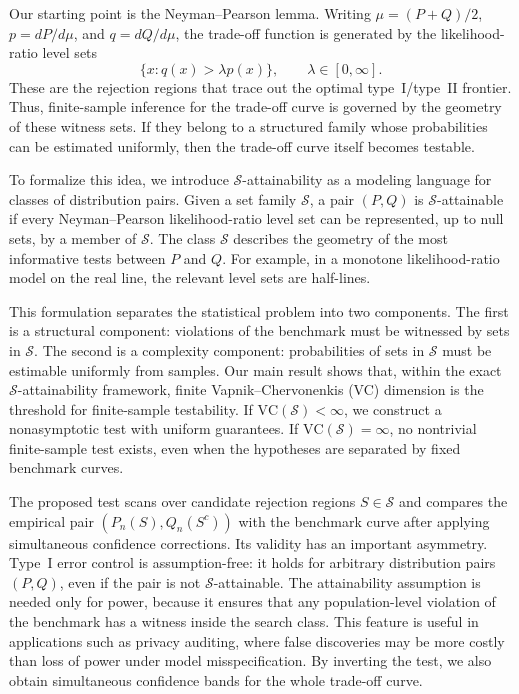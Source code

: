 \documentclass[english]{article}
\theoremstyle{plain}
\theoremstyle{definition}
\begin{document}
Our starting point is the Neyman--Pearson lemma. Writing \(\mu=(P+Q)/2\), \(p=dP/d\mu\), and \(q=dQ/d\mu\), the trade-off function is generated by the likelihood-ratio level sets
\[
\{x:q(x)>\lambda p(x)\}, \qquad \lambda \in [0, \infty].
\]
These are the rejection regions that trace out the optimal type~I/type~II frontier. Thus, finite-sample inference for the trade-off curve is governed by the geometry of these witness sets. If they belong to a structured family whose probabilities can be estimated uniformly, then the trade-off curve itself becomes testable.

To formalize this idea, we introduce \(\mathcal S\)-attainability as a modeling language for classes of distribution pairs. Given a set family \(\mathcal S\), a pair \((P,Q)\) is \(\mathcal S\)-attainable if every Neyman--Pearson likelihood-ratio level set can be represented, up to null sets, by a member of \(\mathcal S\). The class \(\mathcal S\) describes the geometry of the most
informative tests between \(P\) and \(Q\). For example, in a monotone
likelihood-ratio model on the real line, the relevant level sets are
half-lines.

This formulation separates the statistical problem into two components. The
first is a structural component: violations of the benchmark must be witnessed
by sets in \(\mathcal S\). The second is a complexity component: probabilities
of sets in \(\mathcal S\) must be estimable uniformly from samples. Our main
result shows that, within the exact \(\mathcal S\)-attainability framework,
finite Vapnik--Chervonenkis (VC) dimension is the threshold for finite-sample
testability. If \(\mathrm{VC}(\mathcal S)<\infty\), we construct a
nonasymptotic test with uniform guarantees. If
\(\mathrm{VC}(\mathcal S)=\infty\), no nontrivial finite-sample test exists,
even when the hypotheses are separated by fixed benchmark curves.


The proposed test scans over candidate rejection regions \(S\in\mathcal S\)
and compares the empirical pair \((P_n(S),Q_n(S^c))\) with the benchmark curve
after applying simultaneous confidence corrections. Its validity has an
important asymmetry. Type~I error control is assumption-free: it holds for
arbitrary distribution pairs \((P,Q)\), even if the pair is not
\(\mathcal S\)-attainable. The attainability assumption is needed only for
power, because it ensures that any population-level violation of the benchmark
has a witness inside the search class. This feature is useful in applications
such as privacy auditing, where false discoveries may be more costly than loss
of power under model misspecification.
By inverting the test, we also obtain simultaneous confidence bands for the whole trade-off
curve. 
\end{document}
